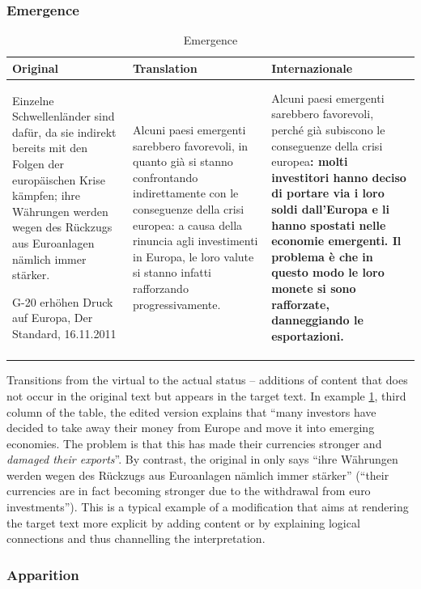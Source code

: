 \documentclass[output=paper]{LSP/langsci}
\begin{document}
\subsubsection{Emergence}
\largerpage
\begin{table}[b]
 \tiny
 \caption{Emergence}
 \label{troqe-marchan:tab:3}
\begin{tabularx}{\textwidth}{XXX}
\lsptoprule
 Original &  Translation &  Internazionale \\
 \midrule
Einzelne Schwellenländer sind dafür, da sie indirekt bereits mit den Folgen der europäischen Krise kämpfen; ihre Währungen werden wegen des Rückzugs aus Euroanlagen nämlich immer stärker. 

 G-20 erhöhen Druck auf Europa, Der Standard, 16.11.2011 &  Alcuni paesi emergenti sarebbero favorevoli, in quanto già si stanno confrontando indirettamente con le conseguenze della crisi europea: a causa della rinuncia agli investimenti in Europa, le loro valute si stanno infatti rafforzando progressivamente.  & Alcuni paesi emergenti sarebbero favorevoli, perché già subiscono le conseguenze della crisi europea\textbf{: molti investitori hanno deciso di portare via i loro soldi dall'Europa e li hanno spostati nelle economie emergenti. Il problema è che in questo modo le loro monete si sono rafforzate, danneggiando le esportazioni.} \\
\lspbottomrule
\end{tabularx}
\end{table}


Transitions from the virtual to the actual status -- additions of content that does not occur in the original text but appears in the target text. In example \ref{troqe-marchan:tab:3}, third column of the table, the edited version explains that ``many investors have decided to take away their money from Europe and move it into emerging economies. The problem is that this has made their currencies stronger and \textit{damaged their exports}''. By contrast, the original in  only says ``ihre Währungen werden wegen des Rückzugs aus Euroanlagen nämlich immer stärker'' (``their currencies are in fact becoming stronger due to the withdrawal from euro investments''). This is a typical example of a modification that aims at rendering the target text more explicit by adding content or by explaining logical connections and thus channelling the interpretation. 


\subsubsection{Apparition}
\end{document}
